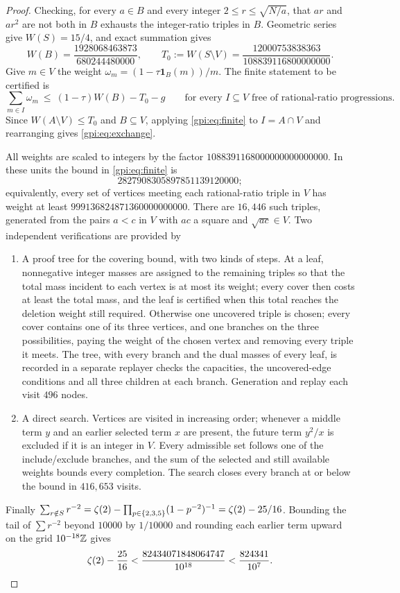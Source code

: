 \begin{proof}
Checking, for every $a\in B$ and every integer $2\le r\le\sqrt{N/a}$, that $ar$ and $ar^2$
are not both in $B$ exhausts the integer-ratio triples in $B$. Geometric series give
$W(S)=15/4$, and exact summation gives
\[
 W(B)=\frac{1928068463873}{680244480000},\qquad
 T_0:=W(S\setminus V)=\frac{12000753838363}{108839116800000000}.
\]
Give $m\in V$ the weight $\omega_m=(1-\tau\mathbf 1_B(m))/m$. The finite statement to be
certified is
\begin{equation}\label{gpi:eq:finite}
 \sum_{m\in I}\omega_m\ \le\ (1-\tau)W(B)-T_0-g
 \qquad\text{for every }I\subseteq V\text{ free of rational-ratio progressions.}
\end{equation}
Since $W(A\setminus V)\le T_0$ and $B\subseteq V$, applying \eqref{gpi:eq:finite} to
$I=A\cap V$ and rearranging gives \eqref{gpi:eq:exchange}.

All weights are scaled to integers by the factor $1088391168000000000000000$. In these units
the bound in \eqref{gpi:eq:finite} is
\[
 2827908305897851139120000 ;
\]
equivalently, every set of vertices meeting each rational-ratio triple in $V$ has weight at
least $999136824871360000000000$.
There are $16{,}446$ such triples, generated from the pairs $a<c$ in $V$ with $ac$ a square
and $\sqrt{ac}\in V$. Two independent verifications are provided by
\begin{enumerate}
\item A proof tree for the covering bound, with two kinds of steps. At a leaf, nonnegative
 integer masses are assigned to the remaining triples so that the total mass incident to each
 vertex is at most its weight; every cover then costs at least the total mass, and the leaf
 is certified when this total reaches the deletion weight still required. Otherwise one
 uncovered triple is chosen; every cover contains one of its three vertices, and one branches
 on the three possibilities, paying the weight of the chosen vertex and removing every triple
 it meets. The tree, with every branch and the dual masses of every leaf, is recorded in
 a separate replayer checks the capacities, the uncovered-edge conditions and all three
 children at each branch. Generation and replay each visit $496$ nodes.
\item A direct search. Vertices are visited in increasing order; whenever a middle term $y$
 and an earlier selected term $x$ are present, the future term $y^2/x$ is excluded if it is an
 integer in $V$. Every admissible set follows one of the include/exclude branches, and the
 sum of the selected and still available weights bounds every completion. The search closes
 every branch at or below the bound in $416{,}653$ visits.
\end{enumerate}
Finally $\sum_{r\notin S}r^{-2}=\zeta(2)-\prod_{p\in\{2,3,5\}}(1-p^{-2})^{-1}=\zeta(2)-25/16$.
Bounding the tail of $\sum r^{-2}$ beyond $10000$ by $1/10000$ and rounding each earlier term
upward on the grid $10^{-18}\mathbb{Z}$ gives
\[
 \zeta(2)-\frac{25}{16}<\frac{82434071848064747}{10^{18}}<\frac{824341}{10^7}. \qedhere
\]
\end{proof}

